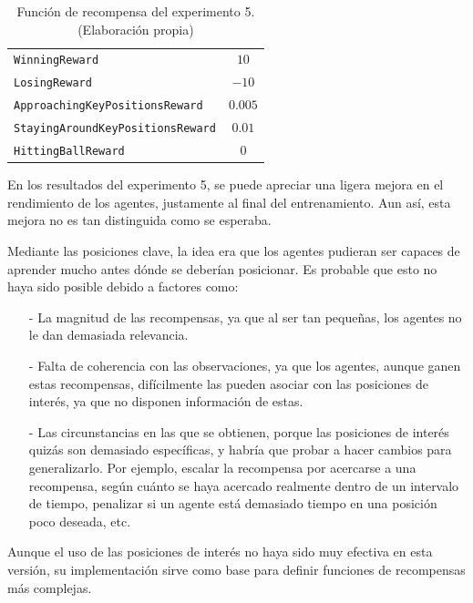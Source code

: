 \begin{table}[H]
\centering
    \begin{tabular}{|>{\rowmac}p{6.5cm}|>{\rowmac}c<{\clearrow}|} 
        \hline
        \multicolumn{1}{|c|}{\textbf{Recompensa}} & \multicolumn{1}{c|}{\textbf{Valor}} \\ \hline \hline
        \texttt{WinningReward} & $10$ \\
        \hline
        \texttt{LosingReward} & $-10$ \\
        \hline
        \texttt{ApproachingKeyPositionsReward} & $0\text{.}005$ \\
        \hline
        \texttt{StayingAroundKeyPositionsReward} & $0\text{.}01$ \\
        \hline
        \texttt{HittingBallReward} & $0$ \\
        \hline
    \end{tabular}
    \caption[Función de recompensa del experimento 5]{Función de recompensa del experimento 5. (Elaboración propia)}
    \label{tab:exp5-rewards}
\end{table}

En los resultados del experimento 5, se puede apreciar una ligera mejora en el rendimiento de los agentes, justamente al final del entrenamiento. Aun así, esta mejora no es tan distinguida como se esperaba.

Mediante las posiciones clave, la idea era que los agentes pudieran ser capaces de aprender mucho antes dónde se deberían posicionar. Es probable que esto no haya sido posible debido a factores como:
\begin{enumerate}
    \item[-] La magnitud de las recompensas, ya que al ser tan pequeñas, los agentes no le dan demasiada relevancia.
    \item[-] Falta de coherencia con las observaciones, ya que los agentes, aunque ganen estas recompensas, difícilmente las pueden asociar con las posiciones de interés, ya que no disponen información de estas.
    \item[-] Las circunstancias en las que se obtienen, porque las posiciones de interés quizás son demasiado específicas, y habría que probar a hacer cambios para generalizarlo. Por ejemplo, escalar la recompensa por acercarse a una recompensa, según cuánto se haya acercado realmente dentro de un intervalo de tiempo, penalizar si un agente está demasiado tiempo en una posición poco deseada, etc.
\end{enumerate}
Aunque el uso de las posiciones de interés no haya sido muy efectiva en esta versión, su implementación sirve como base para definir funciones de recompensas más complejas.

